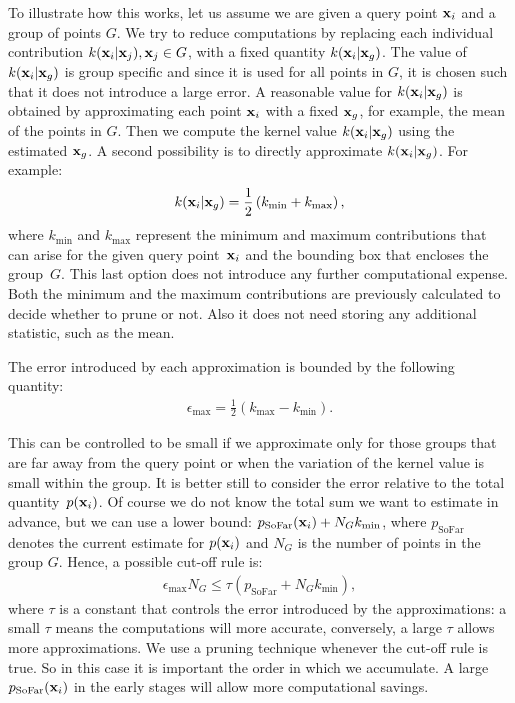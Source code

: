 To illustrate how this works, let us assume we are given a query point $\mathbf{x}_i$ and a group of points $G$. We try to reduce computations by replacing each individual contribution $k(\mathbf{x}_i|\mathbf{x}_j), \mathbf{x}_j\in G$, with a fixed quantity $k(\mathbf{x}_i|\mathbf{x}_g)$. The value of $k(\mathbf{x}_i|\mathbf{x}_g)$ is group specific and since it is used for all points in $G$, it is chosen such that it does not introduce a large error. 
A reasonable value for $k(\mathbf{x}_i|\mathbf{x}_g)$ is obtained by
approximating each point $\mathbf{x}_i$ with a fixed $\mathbf{x}_g$, for example, the mean of the points in $G$. Then we compute the kernel value $k(\mathbf{x}_i|\mathbf{x}_g)$ using the estimated $\mathbf{x}_g$. A second possibility is to directly approximate $k(\mathbf{x}_i|\mathbf{x}_g)$. For example:
\begin{align}
  k(\mathbf{x}_i|\mathbf{x}_g) = \frac{1}{2}\left( k_{\min} + k_{\max} \right),
  \label{eq:approx-rule}
\end{align} 
where $k_{\min}$ and $k_{\max}$ represent the minimum and maximum contributions that can arise for the given query point~$\mathbf{x}_i$ and the bounding box that encloses the group~$G$. This last option does not introduce any further computational expense. Both the minimum and the maximum contributions are previously calculated to decide whether to prune or not. Also it does not need storing any additional statistic, such as the mean.

The error introduced by each approximation is bounded by the following quantity:
\begin{align}
\epsilon_{\max} = \frac{1}{2}\left(k_{\max} - k_{\min}\right). 
\end{align}

This can be controlled to be small if we approximate only for those groups that are far away from the query point or when the variation of the kernel value is small within the group.
It is better still to consider the error relative to the total quantity~$p(\mathbf{x}_i)$. Of course we do not know the total sum we want to estimate in advance, but we can use a lower bound: $p_{\text{SoFar}}(\mathbf{x}_i) + N_Gk_{\min}$, where $p_{\text{SoFar}}$ denotes the current estimate for $p(\mathbf{x}_i)$ and $N_G$ is the number of points in the group $G$. Hence, a possible cut-off rule is: 
\begin{align}
  \epsilon_{\max}N_G \le \tau (p_{\text{SoFar}} + N_Gk_{\min}),
\end{align}
where $\tau$ is a constant that controls the error introduced by the approximations: a small $\tau$ means the computations will more accurate, conversely, a large $\tau$ allows more approximations. We use a pruning technique whenever the cut-off rule is true. So in this case it is important the order in which we accumulate. A large $p_{\text{SoFar}}(\mathbf{x}_i)$ in the early stages will allow more computational savings.


